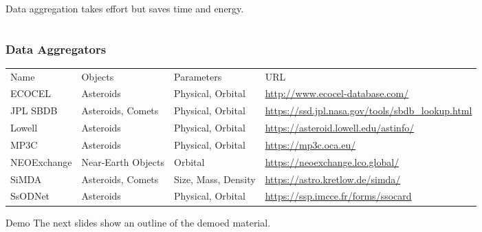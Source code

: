 \begin{frame}
\begin{columns}[T]
\begin{column}{.7\textwidth}
\begin{overlayarea}{\textwidth}{\textheight}
\begin{onlyenv}
\begin{itemize}[<.->]
          \end{itemize}

          \vspace{0.5em}
          Data aggregation takes effort but saves time and energy.
        \end{onlyenv}
      \end{overlayarea}
    \end{column}

  \end{columns}

\end{frame}

\begin{frame}[t]
  \frametitle{Data Aggregators}
  {\scriptsize
  \begin{table}[t]
    \begin{tabular}{llll}
      Name & Objects & Parameters & URL \\
      ECOCEL & Asteroids & Physical, Orbital &  \url{http://www.ecocel-database.com/}\\
      JPL SBDB & Asteroids, Comets & Physical, Orbital &  \url{https://ssd.jpl.nasa.gov/tools/sbdb_lookup.html}\\
      Lowell & Asteroids & Physical, Orbital &  \url{https://asteroid.lowell.edu/astinfo/}\\
      MP3C & Asteroids & Physical, Orbital &  \url{https://mp3c.oca.eu/}\\
      NEOExchange & Near-Earth Objects & Orbital &  \url{https://neoexchange.lco.global/}\\
      SiMDA & Asteroids, Comets & Size, Mass, Density &  \url{https://astro.kretlow.de/simda/}\\
      SsODNet & Asteroids & Physical, Orbital &  \url{https://ssp.imcce.fr/forms/ssocard}\\
    \end{tabular}
  \end{table}
  }
\end{frame}

\begin{frame}[t]{Demo}
  The next slides show an outline of the demoed material.
\end{frame}

